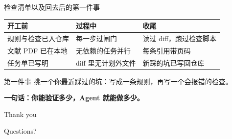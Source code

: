 \documentclass[aspectratio=169]{beamer}
\begin{document}
\begin{frame}{检查清单}{以及回去后的第一件事}
  \begin{center}
  \footnotesize
  \begin{tabular}{lll}
    \toprule
    \textbf{开工前} & \textbf{过程中} & \textbf{收尾} \\
    \midrule
    规则与检查已入仓库 & 每一步过闸门 & 读过 diff，跑过检查脚本 \\
    文献 PDF 已在本地 & 无依赖的任务并行 & 每条引用带页码 \\
    任务单已写明 & diff 里无计划外文件 & 新踩的坑已写回仓库 \\
    \bottomrule
  \end{tabular}
  \end{center}
  \begin{alertblock}{第一件事}
    挑一个你最近踩过的坑：写成一条规则，再写一个会报错的检查。
  \end{alertblock}
  \begin{center}
  \textbf{一句话：你能验证多少，Agent 就能做多少。}
  \end{center}
\end{frame}

\begin{frame}[plain]
  \begin{center}
    {\Huge Thank you}

    \bigskip
    {\Large Questions?}
  \end{center}
\end{frame}
\end{document}
